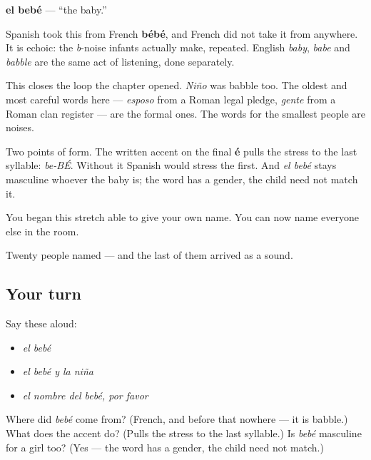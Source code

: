 \begin{cousinweb}
\textbf{el bebé} --- \textquotedblleft{}the baby.\textquotedblright{}

Spanish took this from French \textbf{bébé}, and French did not take it from anywhere. It is echoic: the \emph{b}-noise infants actually make, repeated. English \emph{baby}, \emph{babe} and \emph{babble} are the same act of listening, done separately.

This closes the loop the chapter opened. \emph{Niño} was babble too. The oldest and most careful words here --- \emph{esposo} from a Roman legal pledge, \emph{gente} from a Roman clan register --- are the formal ones. The words for the smallest people are noises.

Two points of form. The written accent on the final \textbf{é} pulls the stress to the last syllable: \emph{be-BÉ}. Without it Spanish would stress the first. And \emph{el bebé} stays masculine whoever the baby is; the word has a gender, the child need not match it.

You began this stretch able to give your own name. You can now name everyone else in the room.
\end{cousinweb}

\begin{grammarlens}[title={What you've built}]
Twenty people named --- and the last of them arrived as a sound.
\end{grammarlens}

\subsection*{Your turn}
Say these aloud:

\begin{itemize}
\raggedright
  \item \emph{el bebé}
  \item \emph{el bebé y la niña}
  \item \emph{el nombre del bebé, por favor}
\end{itemize}

\begin{tcolorbox}[breakable,colback=teal!4,colframe=teal!35!black,title={Before you move on}]
Where did \emph{bebé} come from? (French, and before that nowhere --- it is babble.) What does the accent do? (Pulls the stress to the last syllable.) Is \emph{bebé} masculine for a girl too? (Yes --- the word has a gender, the child need not match.)
\end{tcolorbox}
